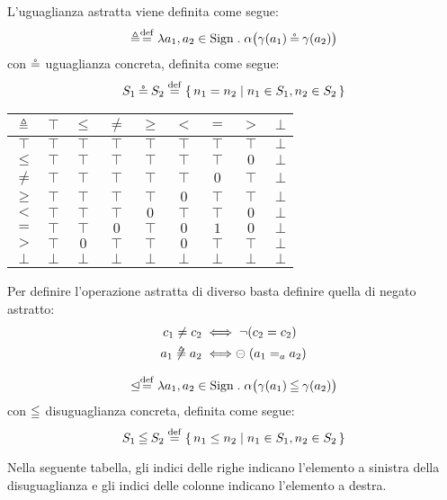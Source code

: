 \begin{definizione}
L'uguaglianza astratta viene definita come segue:
\[
  \abseq \defeq \lambda a_1,a_2 \in \Sign \st \alpha\bigl(\gamma(a_1) \coneq \gamma(a_2)\bigr)
\]
con $\mathbin{\circeq}$ uguaglianza concreta, definita come segue:
\[
  S_1 \coneq S_2 \defeq \{\, n_1 = n_2 \mid n_1 \in S_1, n_2 \in S_2 \,\}
\]
\end{definizione}

\begin{center}
  \begin{tabular}{ c | c c c c c c c c }
    $\mathrel{\triangleq}$ & $\top$ & $\leq$ & $\neq$ & $\geq$ & $<$ & $=$ & $>$ & $\bot$ \\
    \hline
    $\top$ & $\top$ & $\top$ & $\top$ & $\top$ & $\top$ & $\top$ & $\top$ & $\bot$ \\
    $\leq$ & $\top$ & $\top$ & $\top$ & $\top$ & $\top$ & $\top$ & $0$ & $\bot$\\
    $\neq$ & $\top$ & $\top$ & $\top$ & $\top$ & $\top$ & $0$ & $\top$ & $\bot$\\
    $\geq$ & $\top$ & $\top$ & $\top$ & $\top$ & $0$ & $\top$ & $\top$ & $\bot$\\
    $<$ & $\top$ & $\top$ & $\top$ & $0$ & $\top$ & $\top$ & $0$ & $\bot$\\
    $=$ & $\top$ & $\top$ & $0$ & $\top$ & $0$ & $1$ & $0$ & $\bot$\\
    $>$ & $\top$ & $0$ & $\top$ & $\top$ & $0$ & $\top$ & $\top$ & $\bot$\\
    $\bot$ & $\bot$ & $\bot$ & $\bot$ & $\bot$ & $\bot$ & $\bot$ & $\bot$ & $\bot$
  \end{tabular}
\end{center}


\begin{definizione}
Per definire l'operazione astratta di diverso basta definire quella di negato astratto:
\begin{align*}
  c_1 \neq c_2 &\iff \neg (c_2 = c_2) \\
  a_1 \mathrel{\not\triangleq} a_2 &\iff \mathrel{\circleddash} (a_1 =_a a_2)
\end{align*}
\end{definizione}

\begin{definizione}
\[
  \absleq \defeq \lambda a_1,a_2 \in \Sign \st \alpha\bigl(\gamma(a_1) \conineq \gamma(a_2)\bigr)
\]
con $\mathbin{\leqq}$ disuguaglianza concreta, definita come segue:
\[
  S_1 \conineq S_2 \defeq \{\, n_1 \leq n_2 \mid n_1 \in S_1, n_2 \in S_2 \,\}
\]
\end{definizione}
Nella seguente tabella, gli indici delle righe indicano
l'elemento a sinistra della disuguaglianza e gli indici delle colonne
indicano l'elemento a destra.

